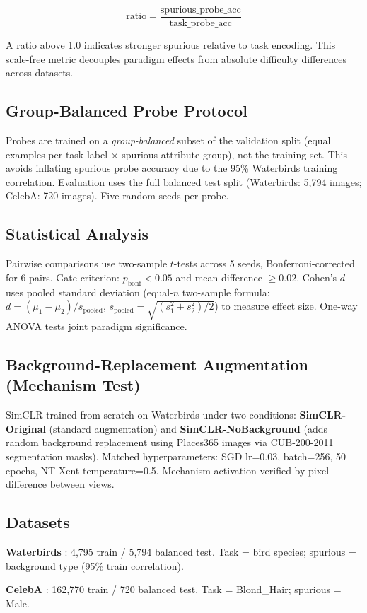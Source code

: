 \begin{equation}
\text{ratio} = \frac{\text{spurious\_probe\_acc}}{\text{task\_probe\_acc}}
\end{equation}

A ratio above 1.0 indicates stronger spurious relative to task encoding. This scale-free metric decouples paradigm effects from absolute difficulty differences across datasets.

\subsection{Group-Balanced Probe Protocol}

Probes are trained on a \textit{group-balanced} subset of the validation split (equal examples per task label $\times$ spurious attribute group), not the training set. This avoids inflating spurious probe accuracy due to the 95\% Waterbirds training correlation. Evaluation uses the full balanced test split (Waterbirds: 5,794 images; CelebA: 720 images). Five random seeds per probe.

\subsection{Statistical Analysis}

Pairwise comparisons use two-sample $t$-tests across 5 seeds, Bonferroni-corrected for 6 pairs. Gate criterion: $p_\text{bonf} < 0.05$ and mean difference $\geq 0.02$. Cohen's $d$ uses pooled standard deviation (equal-$n$ two-sample formula: $d = (\mu_1 - \mu_2)/s_\text{pooled}$, $s_\text{pooled} = \sqrt{(s_1^2 + s_2^2)/2}$) to measure effect size. One-way ANOVA tests joint paradigm significance.

\subsection{Background-Replacement Augmentation (Mechanism Test)}

SimCLR trained from scratch on Waterbirds under two conditions: \textbf{SimCLR-Original} (standard augmentation) and \textbf{SimCLR-NoBackground} (adds random background replacement using Places365 images via CUB-200-2011 segmentation masks). Matched hyperparameters: SGD lr=0.03, batch=256, 50 epochs, NT-Xent temperature=0.5. Mechanism activation verified by pixel difference between views.

\subsection{Datasets}

\textbf{Waterbirds} \citep{Sagawa2020GroupDRO}: 4,795 train / 5,794 balanced test. Task = bird species; spurious = background type (95\% train correlation).

\textbf{CelebA} \citep{Liu2015CelebA}: 162,770 train / 720 balanced test. Task = Blond\_Hair; spurious = Male.

